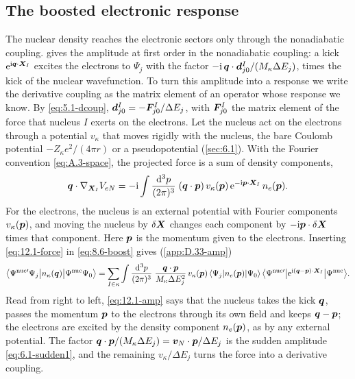 \subsection{The boosted electronic response}\label{sec:12.1-boost}

The nuclear density reaches the electronic sectors only through the nonadiabatic coupling.  gives the amplitude at first order in the nonadiabatic coupling: a kick $\mathrm{e}^{\mathrm{i}\bm{q}\cdot\bm{X}_I}$ excites the electrons to $\Psi_j$ with the factor $-\mathrm{i}\,\bm{q}\cdot\bm{d}^I_{j0}/(M_\kappa\Delta E_j)$, times the kick of the nuclear wavefunction. To turn this amplitude into a response we write the derivative coupling as the matrix element of an operator whose response we know. By \cref{eq:5.1-dcoup}, $\bm{d}^I_{j0} = -\bm{F}^I_{j0}/\Delta E_j$, with $\bm{F}^I_{j0}$ the matrix element of the force that nucleus $I$ exerts on the electrons. Let the nucleus act on the electrons through a potential $v_\kappa$ that moves rigidly with the nucleus, the bare Coulomb potential $-Z_\kappa e^2/(4\pi r)$ or a pseudopotential (\cref{sec:6.1}). With the Fourier convention \cref{eq:A.3-space}, the projected force is a sum of density components,
\begin{equation}
  \bm{q}\cdot\nabla_{\bm{X}_I}V_{eN} = -\mathrm{i}\int\frac{\mathrm{d}^3p}{(2\pi)^3}\;(\bm{q}\cdot\bm{p})\,v_\kappa(\bm{p})\,\mathrm{e}^{-\mathrm{i}\bm{p}\cdot\bm{X}_I}\,n_e(\bm{p}) .
  \label{eq:12.1-force}
\end{equation}
For the electrons, the nucleus is an external potential with Fourier components $v_\kappa(\bm{p})$, and moving the nucleus by $\delta\bm{X}$ changes each component by $-\mathrm{i}\bm{p}\cdot\delta\bm{X}$ times that component. Here $\bm{p}$ is the momentum given to the electrons. Inserting \cref{eq:12.1-force} in \cref{eq:8.6-boost} gives (\cref{app:D.33-amp})
\begin{equation}
  \bigl\langle\Psi^{\mathrm{nuc}\prime}\Psi_j\big|n_\kappa(\bm{q})\big|\Psi^{\mathrm{nuc}}\Psi_0\bigr\rangle
  = \sum_{I\in\kappa}\int\frac{\mathrm{d}^3p}{(2\pi)^3}\;\frac{\bm{q}\cdot\bm{p}}{M_\kappa\Delta E_j^2}\,v_\kappa(\bm{p})\,\langle\Psi_j|n_e(\bm{p})|\Psi_0\rangle\,\bigl\langle\Psi^{\mathrm{nuc}\prime}\big|\mathrm{e}^{\mathrm{i}(\bm{q} - \bm{p})\cdot\bm{X}_I}\big|\Psi^{\mathrm{nuc}}\bigr\rangle .
  \label{eq:12.1-amp}
\end{equation}
Read from right to left, \cref{eq:12.1-amp} says that the nucleus takes the kick $\bm{q}$, passes the momentum $\bm{p}$ to the electrons through its own field and keeps $\bm{q} - \bm{p}$; the electrons are excited by the density component $n_e(\bm{p})$, as by any external potential. The factor $\bm{q}\cdot\bm{p}/(M_\kappa\Delta E_j) = \bm{v}_N\cdot\bm{p}/\Delta E_j$ is the sudden amplitude \cref{eq:6.1-sudden1}, and the remaining $v_\kappa/\Delta E_j$ turns the force into a derivative coupling.


